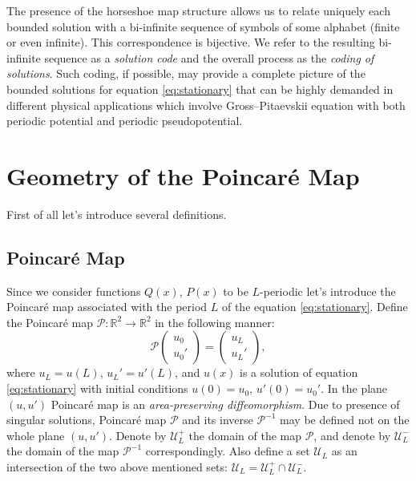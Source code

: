 The presence of the horseshoe map structure allows us to relate uniquely each bounded solution with a bi-infinite sequence of symbols of some alphabet (finite or even infinite).
This correspondence is bijective.
We refer to the resulting bi-infinite sequence as a {\it solution code} and the overall process as the {\it coding of solutions}.
Such coding, if possible, may provide a complete picture of the bounded solutions for equation \eqref{eq:stationary} that can be highly demanded in different physical applications which involve Gross--Pitaevskii equation with both periodic potential and periodic pseudopotential.

\section{Geometry of the Poincar\'e Map}

First of all let's introduce several definitions.

\subsection{Poincar\'e Map}

Since we consider functions $Q(x)$, $P(x)$ to be $L$-periodic let's introduce the Poincar\'e map associated with the period $L$ of the equation \eqref{eq:stationary}.
Define the Poincar\'e map $\mathcal{P}: \mathbb{R}^2 \to \mathbb{R}^2$ in the following manner:
\begin{equation}
	\mathcal{P} \begin{pmatrix} u_0 \\ u_0' \end{pmatrix}
	= \begin{pmatrix} u_L \\ u_L' \end{pmatrix},
\label{eq:poincare-map}
\end{equation}
where $u_L = u(L)$, $u_L' = u'(L)$, and $u(x)$ is a solution of equation \eqref{eq:stationary} with initial conditions $u(0) = u_0$, $u'(0) = u_0'$.
In the plane $(u, u')$ Poincar\'e map is an {\it area-preserving diffeomorphism}.
Due to presence of singular solutions, Poincar\'e map $\mathcal{P}$ and its inverse $\mathcal{P}^{-1}$ may be defined not on the whole plane $(u, u')$.
Denote by $\mathscr{U}_L^+$ the domain of the map $\mathcal{P}$, and denote by $\mathscr{U}_L^-$ the domain of the map $\mathcal{P}^{-1}$ correspondingly.
Also define a set $\mathscr{U}_L$ as an intersection of the two above mentioned sets: $\mathscr{U}_L = \mathscr{U}_L^+ \cap \mathscr{U}_L^-$.

